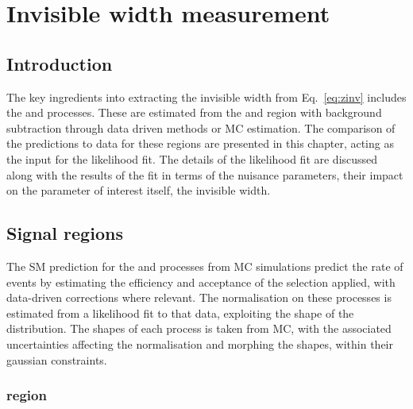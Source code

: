 \chapter{Invisible width measurement}
\label{chap:inv-width-extraction}


\section{Introduction}

The key ingredients into extracting the \PZ invisible width from Eq.~\ref{eq:zinv} includes the \IZvvj and \IZllj processes. These are estimated from the \metplusjets and \diellplusjets region with background subtraction through data driven methods or MC estimation. The comparison of the predictions to data for these regions are presented in this chapter, acting as the input for the likelihood fit. The details of the likelihood fit are discussed along with the results of the fit in terms of the nuisance parameters, their impact on the parameter of interest itself, the \PZ invisible width.


\section{Signal regions}

The SM prediction for the \IZvvj and \IZllj processes from MC simulations
predict the rate of events by estimating the efficiency and acceptance of the
selection applied, with data-driven corrections where relevant. The
normalisation on these processes is estimated from a likelihood fit to that
data, exploiting the shape of the \recoil distribution. The shapes of each
process is taken from MC, with the associated uncertainties affecting the
normalisation and morphing the shapes, within their gaussian constraints.


\subsection{\diellplusjets region}

